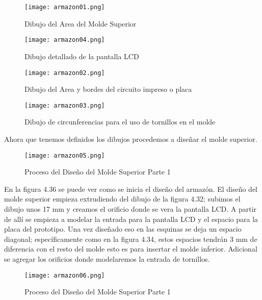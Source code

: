 \begin{figure}[H]
	\centering
	\texttt{[image: armazon01.png]}
	\caption{Dibujo del Area del Molde Superior}
\end{figure}

\begin{figure}[H]
	\centering
	\texttt{[image: armazon04.png]}
	\caption{Dibujo detallado de la pantalla LCD}
\end{figure}

\begin{figure}[H]
	\centering
	\texttt{[image: armazon02.png]}
	\caption{Dibujo del Area y bordes del circuito impreso o placa}
\end{figure}

\begin{figure}[H]
	\centering
	\texttt{[image: armazon03.png]}
	\caption{Dibujo de circunferencias para el uso de tornillos en el molde}
\end{figure}

\clearpage

\par \noindent
Ahora que tenemos definidos los dibujos procedemos a diseñar el molde superior.

\begin{figure}[H]
	\centering
	\texttt{[image: armazon05.png]}
	\caption{Proceso del Diseño del Molde Superior Parte 1}
\end{figure}

\par \noindent
En la figura 4.36 se puede ver como se inicia el diseño del armazón. El diseño del molde superior empieza extrudiendo del dibujo de la figura 4.32; subimos el dibujo unos 17 mm y creamos el orificio donde se vera la pantalla LCD. A partir de allí se empieza a modelar la entrada para la pantalla LCD y el espacio para la placa del prototipo. Una vez diseñado eso en las esquinas se deja un espacio diagonal; específicamente como en la figura 4.34, estos espacios tendrán 3 mm de diferencia con el resto del molde esto es para insertar el molde inferior. Adicional se agregar los orificios donde modelaremos la entrada de tornillos.

\begin{figure}[H]
	\centering
	\texttt{[image: armazon06.png]}
	\caption{Proceso del Diseño del Molde Superior Parte 1}
\end{figure}

